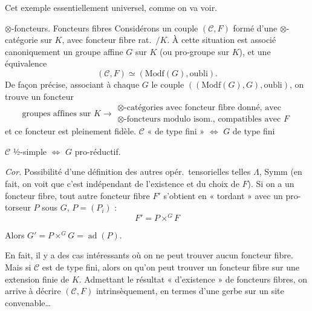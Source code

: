 \documentclass[11pt,a4paper]{article}
\begin{document}
Cet exemple  essentiellement universel, comme on va voir.

$\otimes$-foncteurs. Foncteurs fibres 
Considérons un couple $(\mathcal{C}, F)$ formé d'une $\otimes$-catégorie sur
$K$, avec foncteur fibre rat.\ $/K$. À cette situation est associé
canoniquement un groupe  affine $G$ sur $K$ (ou pro-groupe
 sur $K$), et une équivalence
\[
  (\mathcal{C}, F) \simeq (\mathrm{Modf}(G), \text{oubli}).
\]
De façon précise, associant à chaque $G$ le couple
$((\mathrm{Modf}(G), G), \text{oubli})$, on trouve un foncteur
\[
  \text{groupes affines sur } K \longrightarrow
  \begin{array}{l}
    \otimes\text{-catégories avec foncteur fibre donné, avec} \\ \otimes\text{-foncteurs modulo isom., compatibles avec } F
  \end{array}
\]
et ce foncteur est pleinement fidèle.
$\mathcal{C}$ « de type fini » $\Longleftrightarrow$ $G$ de type fini

$\mathcal{C}$ ½-simple $\Longleftrightarrow$ $G$ pro-réductif.
\struck{\ill{}}


\emph{Cor.} Possibilité d'une définition des autres opér.\ tensorielles telles
$\Lambda$, $\mathrm{Symm}$ (en fait, on voit que c'est indépendant de
l'existence et du choix de $F$). Si on a un foncteur fibre, tout autre
foncteur fibre $F'$ s'obtient en « tordant » avec un pro-torseur $P$ sous $G$,
$P = (P_{i})$ :
\[
  F' = P \times^{G} F
\]


Alors $G' = P \times^{G} G = \operatorname{ad}(P)$.

En fait, il y a des cas intéressants où on ne peut trouver aucun foncteur
fibre. Mais si $\mathcal{C}$ est de type fini, alors on
  qu'on peut trouver un foncteur
fibre sur une extension finie de $K$.
 Admettant le résultat
« d'existence » de foncteurs fibres, on  arrive à décrire
$(\mathcal{C}, F)$ intrinsèquement, en termes d'une gerbe sur un site
convenable…
\end{document}
